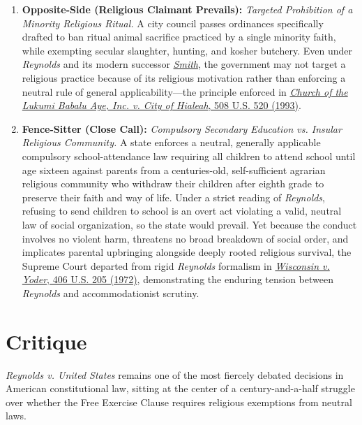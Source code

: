 \documentclass[12pt]{article}
\begin{document}
\begin{enumerate}
\item \textbf{Opposite-Side (Religious Claimant Prevails):} \textit{Targeted Prohibition of a Minority Religious Ritual.} A city council passes ordinances specifically drafted to ban ritual animal sacrifice practiced by a single minority faith, while exempting secular slaughter, hunting, and kosher butchery. Even under \textit{Reynolds} and its modern successor \href{https://supreme.justia.com/cases/federal/us/494/872/}{\textit{Smith}}, the government may not target a religious practice because of its religious motivation rather than enforcing a neutral rule of general applicability---the principle enforced in \href{https://supreme.justia.com/cases/federal/us/508/520/}{\textit{Church of the Lukumi Babalu Aye, Inc. v. City of Hialeah}, 508 U.S. 520 (1993)}.

\item \textbf{Fence-Sitter (Close Call):} \textit{Compulsory Secondary Education vs. Insular Religious Community.} A state enforces a neutral, generally applicable compulsory school-attendance law requiring all children to attend school until age sixteen against parents from a centuries-old, self-sufficient agrarian religious community who withdraw their children after eighth grade to preserve their faith and way of life. Under a strict reading of \textit{Reynolds}, refusing to send children to school is an overt act violating a valid, neutral law of social organization, so the state would prevail. Yet because the conduct involves no violent harm, threatens no broad breakdown of social order, and implicates parental upbringing alongside deeply rooted religious survival, the Supreme Court departed from rigid \textit{Reynolds} formalism in \href{https://supreme.justia.com/cases/federal/us/406/205/}{\textit{Wisconsin v. Yoder}, 406 U.S. 205 (1972)}, demonstrating the enduring tension between \textit{Reynolds} and accommodationist scrutiny.
\end{enumerate}

\section{Critique}

\textit{Reynolds v. United States} remains one of the most fiercely debated decisions in American constitutional law, sitting at the center of a century-and-a-half struggle over whether the Free Exercise Clause requires religious exemptions from neutral laws.
\end{document}
